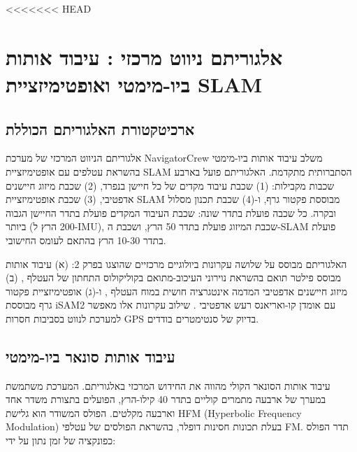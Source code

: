 <<<<<<< HEAD


\section{אלגוריתם ניווט מרכזי : עיבוד אותות ביו-מימטי ואופטימיזציית SLAM}
\label{sec:ch06_algorithm}

\subsection{ארכיטקטורת האלגוריתם הכוללת}
\label{sec:ch06_overall_architecture}

אלגוריתם הניווט המרכזי של מערכת NavigatorCrew משלב עיבוד אותות ביו-מימטי בהשראת עטלפים עם אופטימיזציית SLAM הסתברותית מתקדמת. האלגוריתם פועל בארבע שכבות מקבילות: (1) שכבת עיבוד מקדים של כל חיישן בנפרד, (2) שכבת מיזוג חיישנים אדפטיבי, (3) שכבת אופטימיזציית SLAM מבוססת פקטור גרף, ו-(4) שכבת תכנון מסלול ובקרה. כל שכבה פועלת בתדר שונה: שכבת העיבוד המקדים פועלת בתדר החיישן הגבוה ביותר (200 הרץ ל-IMU), שכבת המיזוג פועלת בתדר 50 הרץ, ושכבת ה-SLAM פועלת בתדר 10-30 הרץ בהתאם לעומס החישובי.

האלגוריתם מבוסס על שלושה עקרונות ביולוגיים מרכזיים שהוצגו בפרק 2: (א) עיבוד אותות מבוסס פילטר תואם בהשראת נוירוני העיכוב-מתואם בקוליקולוס התחתון של העטלף \cite{Simmons1979BatSonar}, (ב) מיזוג חיישנים אדפטיבי המדמה אינטגרציה חושית במוח העטלף \cite{MossEcholocation}, ו-(ג) אופטימיזציית פקטור גרף מבוססת iSAM2 עם אומדן קו-ואריאנס רעש אדפטיבי \cite{Kaess2012iSAM2, BenDavid2022Adaptive}. שילוב עקרונות אלו מאפשר למערכת לנווט בסביבות חסרות GPS בדיוק של סנטימטרים בודדים.

\subsection{עיבוד אותות סונאר ביו-מימטי}
\label{sec:ch06_sonar_processing}

עיבוד אותות הסונאר הקולי מהווה את החידוש המרכזי באלגוריתם. המערכת משתמשת במערך של ארבעה מתמרים קוליים בתדר 40 קילו-הרץ, הפועלים בתצורת משדר אחד וארבעה מקלטים. הפולס המשודר הוא גלישת HFM (Hyperbolic Frequency Modulation) בעלת תכונות חסינות דופלר, בהשראת הפולסים של עטלפי FM. תדר הפולס כפונקציה של זמן נתון על ידי:

